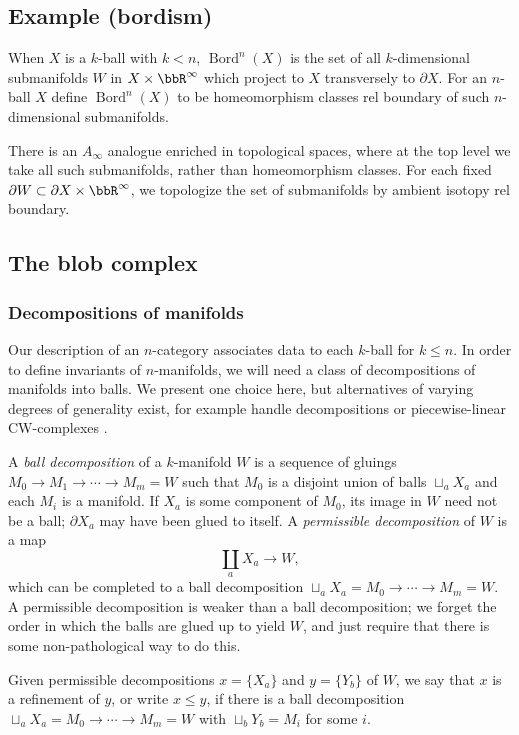\documentclass{pnastwo}
\newcommand{\Bord}{\operatorname{Bord}}
\newcommand{\bdy}{\partial}
\def\du{\sqcup}
\def\bd{\partial}
\begin{document}
\begin{article}
\subsection{Example (bordism)} \mbox{}
When $X$ is a $k$-ball with $k<n$, $\Bord^n(X)$ is the set of all $k$-dimensional
submanifolds $W$ in $X\times \bbR^\infty$ which project to $X$ transversely
to $\bd X$.
For an $n$-ball $X$ define $\Bord^n(X)$ to be homeomorphism classes rel boundary of such $n$-dimensional submanifolds.

There is an $A_\infty$ analogue enriched in topological spaces, where at the top level we take 
all such submanifolds, rather than homeomorphism classes. 
For each fixed $\bdy W \subset \bdy X \times \bbR^\infty$, we 
topologize the set of submanifolds by ambient isotopy rel boundary.

\subsection{The blob complex}
\subsubsection{Decompositions of manifolds}
Our description of an $n$-category associates data to each $k$-ball for $k\leq n$. In order to define invariants of $n$-manifolds, we will need a class of decompositions of manifolds into balls. We present one choice here, but alternatives of varying degrees of generality exist, for example handle decompositions or piecewise-linear CW-complexes \cite{1009.4227}.

A \emph{ball decomposition} of a $k$-manifold $W$ is a 
sequence of gluings $M_0\to M_1\to\cdots\to M_m = W$ such that $M_0$ is a disjoint union of balls
$\du_a X_a$ and each $M_i$ is a manifold.
If $X_a$ is some component of $M_0$, its image in $W$ need not be a ball; $\bd X_a$ may have been glued to itself.
A {\it permissible decomposition} of $W$ is a map
\[
	\coprod_a X_a \to W,
\]
which can be completed to a ball decomposition $\du_a X_a = M_0\to\cdots\to M_m = W$.
A permissible decomposition is weaker than a ball decomposition; we forget the order in which the balls
are glued up to yield $W$, and just require that there is some non-pathological way to do this. 

Given permissible decompositions $x = \{X_a\}$ and $y = \{Y_b\}$ of $W$, we say that $x$ is a refinement
of $y$, or write $x \le y$, if there is a ball decomposition $\du_a X_a = M_0\to\cdots\to M_m = W$
with $\du_b Y_b = M_i$ for some $i$.


\end{article}
\end{document}
